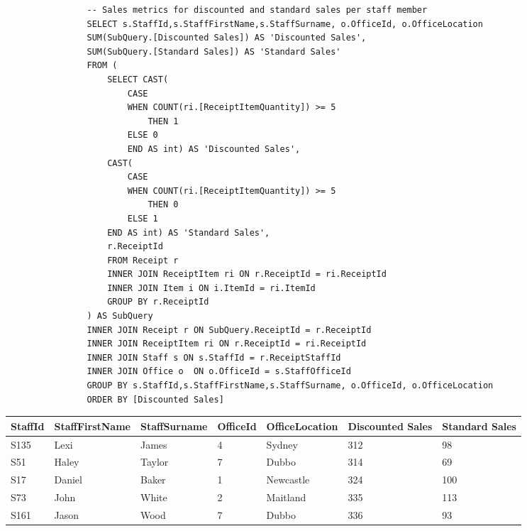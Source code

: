 \documentclass{article}
\begin{document}
            \begin{lstlisting}
                -- Sales metrics for discounted and standard sales per staff member
                SELECT s.StaffId,s.StaffFirstName,s.StaffSurname, o.OfficeId, o.OfficeLocation
                SUM(SubQuery.[Discounted Sales]) AS 'Discounted Sales',
                SUM(SubQuery.[Standard Sales]) AS 'Standard Sales'
                FROM (
                    SELECT CAST(
                        CASE
                        WHEN COUNT(ri.[ReceiptItemQuantity]) >= 5
                            THEN 1
                        ELSE 0
                        END AS int) AS 'Discounted Sales',
                    CAST(
                        CASE
                        WHEN COUNT(ri.[ReceiptItemQuantity]) >= 5
                            THEN 0
                        ELSE 1
                    END AS int) AS 'Standard Sales',
                    r.ReceiptId
                    FROM Receipt r
                    INNER JOIN ReceiptItem ri ON r.ReceiptId = ri.ReceiptId
                    INNER JOIN Item i ON i.ItemId = ri.ItemId
                    GROUP BY r.ReceiptId
                ) AS SubQuery
                INNER JOIN Receipt r ON SubQuery.ReceiptId = r.ReceiptId
                INNER JOIN ReceiptItem ri ON r.ReceiptId = ri.ReceiptId
                INNER JOIN Staff s ON s.StaffId = r.ReceiptStaffId
                INNER JOIN Office o  ON o.OfficeId = s.StaffOfficeId
                GROUP BY s.StaffId,s.StaffFirstName,s.StaffSurname, o.OfficeId, o.OfficeLocation
                ORDER BY [Discounted Sales]
            \end{lstlisting}

            \begin{table}[H]
                \centering
                \begin{tabular}{|l|l|l|l|}
                \hline
                StaffId & StaffFirstName & StaffSurname & OfficeId & OfficeLocation & Discounted Sales & Standard Sales \\ \hline
                S135    & Lexi           & James        & 4        & Sydney         & 312              & 98             \\ \hline
                S51     & Haley          & Taylor       & 7        & Dubbo          & 314              & 69             \\ \hline
                S17     & Daniel         & Baker        & 1        & Newcastle      & 324              & 100            \\ \hline
                S73     & John           & White        & 2        & Maitland       & 335              & 113            \\ \hline
                S161    & Jason          & Wood         & 7        & Dubbo          & 336              & 93             \\ \hline
                \end{tabular}
                \end{table}
\end{document}
